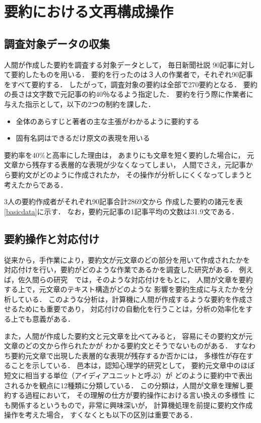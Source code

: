 \section{要約における文再構成操作}

\subsection{調査対象データの収集}
人間が作成した要約を調査する対象データとして，
毎日新聞社説 90記事に対して要約したものを用いる．
要約を行ったのは３人の作業者で，それぞれ90記事をすべて要約する．
したがって，調査対象の要約は全部で270要約となる．
要約の長さは文字数で元記事の約40％なるよう指定した．
要約を行う際に作業者に与えた指示として，以下の2つの制約を課した．

\begin{itemize}
\item  全体のあらすじと著者の主な主張がわかるように要約する
\item  固有名詞はできるだけ原文の表現を用いる
\end{itemize}


要約率を40\%と高率にした理由は，
あまりにも文章を短く要約した場合に，
元文章から残存する表層的な表現が少なくなってしまい，
人間でさえ，元記事から要約文がどのように作成されたか，
その操作が分析しにくくなってしまうと考えたからである．

3人の要約作成者がそれぞれ90記事合計2869文から
作成した要約の諸元を表\ref{basicdata}に示す．
なお，要約元記事の1記事平均の文数は31.9文である．

\subsection{要約操作と対応付け}

従来から，手作業により，要約文が元文章のどの部分を用いて作成されたかを
対応付けを行い，要約がどのような作業であるかを調査した研究がある．
例えば，佐久間らの研究　\cite{sakuma}では，そのような対応付けをもとに，
人間が文章を要約する上で，元文章のテキスト構造がどのような
影響を要約生成に与えたかを分析している．
このような分析は，計算機に人間が作成するような要約を作成させるためにも重要であり，
対応付けの自動化を行うことは，分析の効率化をする上でも意義がある．

また，人間が作成した要約文と元文章を比べてみると，
容易にその要約文が元文章のどの文から作られたかが
わかる要約文とそうでないものがある．
すなわち要約元文章で出現した表層的な表現が残存するか否かには，
多様性が存在することを示している．
邑本\cite{muramoto}は，認知心理学的研究として，
要約元文章中のほぼ短文に相当する単位（アイディアユニットと呼ぶ）が
どのように要約中で表出されるかを観点に12種類に分類している．
この分類は，人間が文章を理解し要約する過程において，
その理解の仕方が要約操作における言い換えの多様性
にも関係するというもので，非常に興味深いが，
計算機処理を前提に要約文作成操作を考えた場合，
すくなくとも以下の区別は重要である．


